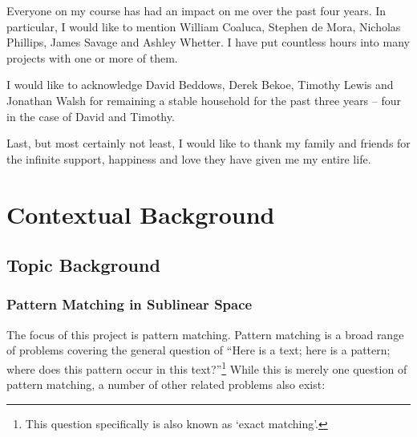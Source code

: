 \documentclass[ %
                    author={Dominic Joseph Moylett},
                    degree={MEng},
                     title={Dictionary Matching with Fingerprints},
                  subtitle={An Empirical Analysis},
                      type={research},
                      year={2015} ]{dissertation}
\begin{document}
Everyone on my course has had an impact on me over the past four years. In particular, I would like to mention William Coaluca, Stephen de Mora, Nicholas Phillips, James Savage and Ashley Whetter. I have put countless hours into many projects with one or more of them.

I would like to acknowledge David Beddows, Derek Bekoe, Timothy Lewis and Jonathan Walsh for remaining a stable household for the past three years -- four in the case of David and Timothy.

Last, but most certainly not least, I would like to thank my family and friends for the infinite support, happiness and love they have given me my entire life.


%

\mainmatter


\chapter{Contextual Background}
\label{chap:context}

\section{Topic Background}

\subsection{Pattern Matching in Sublinear Space}

The focus of this project is pattern matching. Pattern matching is a broad range of problems covering the general question of ``Here is a text; here is a pattern; where does this pattern occur in this text?''\footnote{This question specifically is also known as `exact matching'.} While this is merely one question of pattern matching, a number of other related problems also exist:
\end{document}
